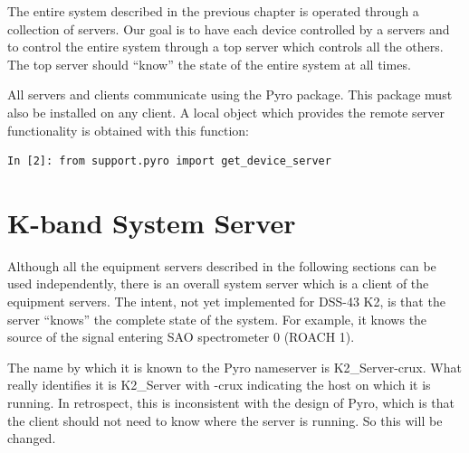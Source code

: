 \documentclass[letterpaper,11pt]{book}
\begin{document}
The entire system described in the previous chapter is operated through a
collection of servers. Our goal is to have each device controlled by a servers
and to control the entire system through a top server which controls all the
others.  The top server should ``know'' the state of the entire system at all
times.

All servers and clients communicate using the Pyro package.  This package must
also be installed on any client.  A local object which provides the remote
server functionality is obtained with this function:
\begin{verbatim}
In [2]: from support.pyro import get_device_server
\end{verbatim}

\section{K-band System Server}

Although all the equipment servers described in the following sections can be
used independently, there is an overall system server which is a client of the
equipment servers.  The intent, not yet implemented for DSS-43 K2, is that the
server ``knows'' the complete state of the system.  For example, it knows the
source of the signal entering SAO spectrometer 0 (ROACH 1).

The name by which it is known to the Pyro nameserver is 
{\ttfamily K2\_Server-crux}.  What really identifies it is {\ttfamily K2\_Server}
with {\ttfamily -crux} indicating the host on which it is running.  In
retrospect, this is inconsistent with the design of Pyro, which is that the
client should not need to know where the server is running.  So this will be
changed.
\end{document}
